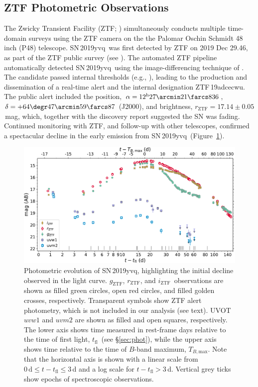 \documentclass[twocolumn]{aastex63}
\newcommand{\rztf}{$r_\mathrm{ZTF}$}
\newcommand{\gztf}{$g_\mathrm{ZTF}$}
\newcommand{\iztf}{$i_\mathrm{ZTF}$}
\newcommand{\tfl}{$t_\mathrm{fl}$}
\newcommand{\tbmax}{$T_{B,\mathrm{max}}$}
\newcommand{\sn}{SN\,2019yvq}
\begin{document}
\subsection{ZTF Photometric Observations}

The Zwicky Transient Facility (ZTF; \citealt{Bellm19,Graham19,Dekany20})
simultaneously conducts multiple time-domain surveys using the ZTF camera on
the the Palomar Oschin Schmidt 48 inch (P48) telescope. \sn\ was first
detected by ZTF on 2019 Dec 29.46, as part of the ZTF public survey (see
\citealt{Bellm19a}). The automated ZTF pipeline \citep{Masci19} automatically
detected \sn\ using the image-differencing technique of \citet{Zackay16}. The
candidate passed internal thresholds (e.g., \citealt{Mahabal19}), leading to
the production and dissemination of a real-time alert \citep{Patterson19} and
the internal designation ZTF\,19adcecwu. The public alert included the
position, $\alpha = 12^{\mathrm{h}}27\arcmin21\farcs836$, $\delta =
+64\degr47\arcmin59\farcs87$ (J2000), and brightness, \rztf$ =
17.14\pm0.05$\,mag, which, together with the \citet{Itagaki19} discovery
report suggested the SN was fading. Continued monitoring with ZTF, and
follow-up with other telescopes, confirmed a spectacular decline in the early
emission from \sn\ (Figure~\ref{fig:p48}).

\begin{figure}
    \centering
    \includegraphics[width=6in]{./figures/P48_lc.pdf}
    \caption{Photometric evolution of \sn, highlighting the initial decline
    observed in the light curve. \gztf, \rztf, and \iztf\ observations are
    shown as filled green circles, open red circles, and filled golden
    crosses, respectively. Transparent symbols show ZTF alert photometry,
    which is not included in our analysis (see text). UVOT $uvw1$ and $uvm2$
    are shown as filled and open squares, respectively. The lower axis shows
    time measured in rest-frame days relative to the time of first light,
    \tfl\ (see \S\ref{sec:phot}), while the upper axis shows time relative to
    the time of $B$-band maximum, \tbmax. Note that the horizontal axis is
    shown with a linear scale from $0\,\mathrm{d} \le t - t_\mathrm{fl} \le
    3$\,d and a log scale for $t - t_\mathrm{fl} > 3$\,d. Vertical grey ticks
    show epochs of spectroscopic observations.}
    \label{fig:p48}
\end{figure}
\end{document}
